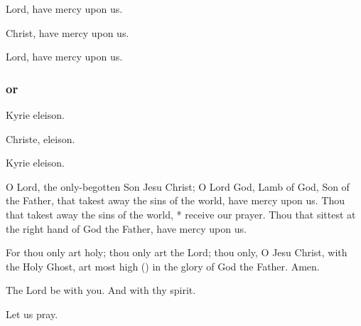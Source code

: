 \medskip


\smallskip

\centerline{Lord, have mercy upon us. }
\centerline{Christ, have mercy upon us. }
\centerline{Lord, have mercy upon us. }
\subsubsection{or}

\centerline{Kyrie eleison. }
\centerline{Christe, eleison. }
\centerline{Kyrie eleison. }

\bigskip



O Lord, the only-begotten Son Jesu Christ; O Lord God, Lamb of God, Son of the Father, that takest away the sins of the world, have mercy upon us. 
Thou that takest away the sins of the world, * receive our prayer. Thou that sittest at the right hand of God the Father, have mercy upon us.

For thou only art holy; thou only art the Lord; thou only, O {Jesu} Christ, with the Holy Ghost, art most high (\grecross) in the glory of God the Father. Amen.


\bigskip
\V The Lord be with you. \R And with thy spirit.

\centerline{Let us pray.}

